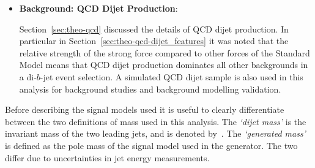\begin{itemize}[leftmargin=*]
\item\textbf{Background: QCD Dijet Production}:  

  \vspace{0.5em}
  Section~\ref{sec:theo-qcd} discussed the details of QCD dijet production.
  In particular in Section~\ref{sec:theo-qcd-dijet_features} it was noted that the
  relative strength of the strong force compared to other forces
  of the Standard Model means that QCD dijet production dominates all other backgrounds in a di-$b$-jet event selection.
  A simulated QCD dijet sample is also used in this analysis
  for background studies and background modelling validation.
  \end{itemize}

\noindent
Before describing the signal models used it is useful to clearly differentiate between the two definitions of mass used in this analysis.
The \textit{`dijet mass'} is the invariant mass of the two leading jets, and is denoted by~\mjj.
The \textit{`generated mass'} is defined as the pole mass of the signal model used in the generator.
The two differ due to uncertainties in jet energy measurements.

